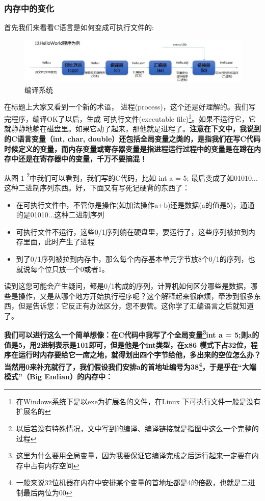 \documentclass[11pt,twoside,a4paper,titlepage]{article}	%
\newcommand{\kw}[1]{\textcolor[rgb]{0.0,0.0,0.63}{ #1}}
\begin{document}
\subsubsection{内存中的变化}

首先我们来看看C语言是如何变成可执行文件的:

\begin{figure}[bpht]
\centering
\includegraphics[scale=.5]{../src/cmpSys.jpg}
\caption{编译系统}
\label{fig:cmpsys}
\end{figure}

在标题上大家又看到一个新的术语，\kw{进程(process)}，这个还是好理解的。我们写完程序，编译OK了以后，生成\kw{可执行文件(executable file)}\footnote{在Windows系统下是以exe为扩展名的文件，在Linux 下可执行文件一般是没有扩展名的}。如果不运行它，它就静静地躺在磁盘里。如果它动了起来，那他就是进程了。\textbf{注意在下文中，我说到的C语言变量（int, char, double）还包括全局变量之类的，是指我们在写C代码时候定义的变量，而内存变量或寄存器变量是指进程运行过程中的变量是在蹲在内存中还是在寄存器中的变量，千万不要搞混！}

从图  \ref{fig:cmpsys} \footnote{以后若没有特殊情况，文中写到的编译、编译链接就是指图中这么一个完整的过程}中我们可以看到，我们写的C代码，比如 int a = 5; 最后变成了如01010...这种二进制序列东西。好，下面又有写死记硬背的东西了：
\begin{itemize}
	\item 在可执行文件中，不管你是操作(如加法操作a+b)还是数据(a的值是5)，通通的是01010...这种二进制序列
	\item 可执行文件不运行，这些0/1序列躺在硬盘里，要运行了，这些序列被拉到内存里面，此时产生了进程
	\item 到了0/1序列被拉到内存中，那么每个内存基本单元字节放8个0/1的序列，也就说每个位只放一个0或者1。
\end{itemize}

读到这您可能会产生疑问，都是0/1构成的序列，计算机如何区分哪些是数据，哪些是操作，又是从哪个地方开始执行程序呢？这个解释起来很麻烦，牵涉到很多东西，但是告诉您：它反正有办法区分，您不要管。这你学了汇编语言之后就知道了。

\textbf{我们可以进行这么一个简单想像：在C代码中我写了个全局变量\footnote{这里为什么要用全局变量，因为我要保证它编译完成之后运行起来一定要在内存中占有内存空间}int a = 5;则a的值是5，用2进制表示是101即可，但是他是个int类型，在x86 模式下占32位，程序在运行时内存要给它一席之地，就得划出四个字节给他，多出来的空位怎么办？当然用0来补充就行了，我们假设我们安排a的首地址编号为38\footnote{一般来说32位机器在内存中安排某个变量的首地址都是4的倍数，也就是二进制最后两位为00}，于是乎在“大端模式”（Big Endian）的内存中：}
\end{document}
